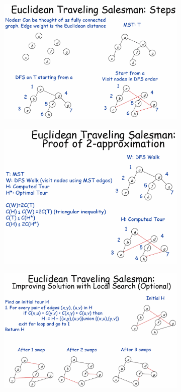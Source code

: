 \documentclass[10pt]{article}
\begin{document}
\begin{figure}[h]
	\centering
	\begin{subfigure}[b]{0.3\textwidth}
		\centering
		\includegraphics[width=\textwidth]{img7-3}
	\end{subfigure}
	\hfill
	\begin{subfigure}[b]{0.3\textwidth}
		\centering
		\includegraphics[width=\textwidth]{img7-4}
	\end{subfigure}
	\hfill
	\begin{subfigure}[b]{0.3\textwidth}
		\centering
		\includegraphics[width=\textwidth]{img7-5}

\end{subfigure}
\end{figure}
\end{document}

